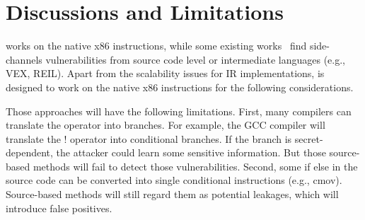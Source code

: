 \section{Discussions and Limitations}

\tool{} works on the native x86 instructions, while
some existing works~\cite{197207,BacelarAlmeida:2013:FVS:2483313.2483334} 
find side-channels vulnerabilities from source code level 
or intermediate languages (e.g., VEX, REIL). Apart from the scalability
issues for IR implementations, \tool{} is designed to work on the
native x86 instructions for the following considerations.

Those approaches will have the following limitations. 
First, many compilers can translate the operator into branches. For example, 
the GCC compiler will translate the ! operator into conditional branches. 
If the branch is secret-dependent, the attacker could learn some sensitive information.
But those source-based methods will fail to detect those vulnerabilities. 
Second, some if else in the source code can be converted into single conditional 
instructions (e.g., cmov). Source-based methods will still regard them as potential leakages, 
which will introduce false positives.


